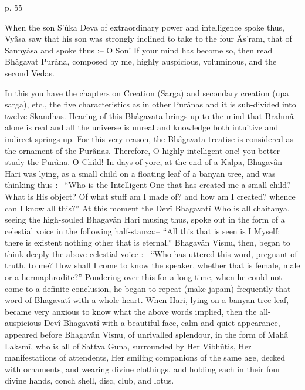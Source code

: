  

p. 55

 

When the son S’ûka Deva of extraordinary power and intelligence spoke thus, Vyâsa saw that his son was strongly inclined to take to the four Âs'ram, that of Sannyâsa and spoke thus :-- O Son! If your mind has become so, then read Bhâgavat Purâna, composed by me, highly auspicious, voluminous, and the second Vedas.

 

In this you have the chapters on Creation (Sarga) and secondary creation (upa sarga), etc., the five characteristics as in other Purânas and it is sub-divided into twelve Skandhas. Hearing of this Bhâgavata brings up to the mind that Brahmâ alone is real and all the universe is unreal and knowledge both intuitive and indirect springs up. For this very reason, the Bhâgavata treatise is considered as the ornament of the Purânas. Therefore, O highly intelligent one! you better study the Purâna. O Child! In days of yore, at the end of a Kalpa, Bhagavân Hari was lying, as a small child on a floating leaf of a banyan tree, and was thinking thus :-- “Who is the Intelligent One that has created me a small child? What is His object? Of what stuff am I made of? and how am I created? whence can I know all this?” At this moment the Devî Bhagavatî Who is all chaitanya, seeing the high-souled Bhagavân Hari musing thus, spoke out in the form of a celestial voice in the following half-stanza:-- “All this that is seen is I Myself; there is existent nothing other that is eternal.” Bhagavân Visnu, then, began to think deeply the above celestial voice :-- “Who has uttered this word, pregnant of truth, to me? How shall I come to know the speaker, whether that is female, male or a hermaphrodite?” Pondering over this for a long time, when he could not come to a definite conclusion, he began to repeat (make japam) frequently that word of Bhagavatî with a whole heart. When Hari, lying on a banyan tree leaf, became very anxious to know what the above words implied, then the all-auspicious Devî Bhagavatî with a beautiful face, calm and quiet appearance, appeared before Bhagavân Visnu, of unrivalled splendour, in the form of Mahâ Laksmî, who is all of Sattva Guna, surrounded by Her Vibhûtis, Her manifestations of attendents, Her smiling companions of the same age, decked with ornaments, and wearing divine clothings, and holding each in their four divine hands, conch shell, disc, club, and lotus.

 

